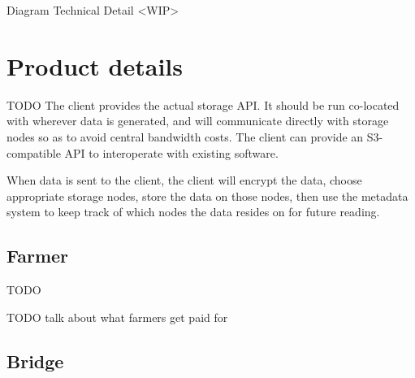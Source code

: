\documentclass[a4paper,10pt]{article} \usepackage[utf8]{inputenc}
\newcommand{\todo}[1]{{\color{red} TODO #1}}
\begin{document}
Diagram Technical Detail <WIP>


\section{Product details}\label{sec:product_details}

\todo{ The client provides the actual storage API. It should be run co-located
with wherever data is generated, and will communicate directly with storage
nodes so as to avoid central bandwidth costs. The client can provide an
S3-compatible API to interoperate with existing software.

When data is sent to the client, the client will encrypt the data, choose
appropriate storage nodes, store the data on those nodes, then use the metadata
system to keep track of which nodes the data resides on for future reading. }

\subsection{Farmer}

\todo{}

\todo{talk about what farmers get paid for}

\subsection{Bridge}
\end{document}
